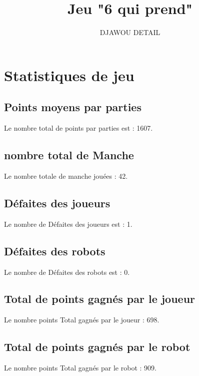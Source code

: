 \documentclass{article}
\begin{document}
\title{ Jeu "6 qui prend"}
\author{DJAWOU DETAIL}
\maketitle

\section*{Statistiques de jeu}

\subsection*{Points moyens par parties}
Le nombre total de points par parties est : 1607.

\subsection*{nombre total de Manche}
Le nombre totale de manche jouées  : 42.
\subsection*{Défaites des joueurs }
Le nombre de Défaites des joueurs est  : 1.
\subsection*{Défaites des robots }
Le nombre de Défaites des robots est  : 0.
\subsection*{Total de points gagnés par le joueur}
Le nombre points Total gagnés par le joueur : 698.
\subsection*{Total de points gagnés par le robot}
Le nombre points Total gagnés par le robot : 909.
\end{document}
